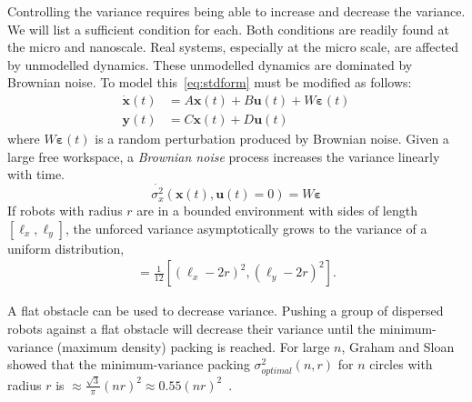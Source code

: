 Controlling the variance requires being able to increase and decrease the variance.  We will list a sufficient condition for each. Both conditions are readily found at the micro and nanoscale. 
Real systems, especially at the micro scale, are affected by unmodelled dynamics. These unmodelled dynamics are dominated by Brownian noise. To model this~\eqref{eq:stdform} must be modified as follows:
\begin{align}
\dot{\mathbf{x}}(t)  &=  A \mathbf{x}(t) + B \mathbf{u}(t) + W \bm{\varepsilon}(t)\\
 \mathbf{y}(t) &= C  \mathbf{x}(t) + D  \mathbf{u}(t)\nonumber
\end{align}
where $W\bm{\varepsilon}(t)$ is a random perturbation produced by Brownian noise. Given a large free workspace, a \emph{Brownian noise} process increases the variance linearly with time.
\begin{equation}\dot{\sigma_x^2}(\mathbf{x}(t), \mathbf{u}(t) = 0)  = W \bm{\varepsilon} \end{equation}
If robots with radius $r$ are in a bounded environment with sides of length $[\ell_x, \ell_y]$, the unforced variance asymptotically grows to the variance of a uniform distribution,
\begin{align}
[\sigma_x^2,\sigma_y^2] = \frac{1}{12}[ (\ell_x - 2 r)^2,(\ell_y - 2 r)^2].\label{eq:VarianceUniformDistribution}
\end{align}

 A flat obstacle can be used to decrease variance. Pushing a group of dispersed robots against a flat obstacle will decrease their variance until the minimum-variance (maximum density) packing  is reached. For large $n$, Graham and Sloan showed that the minimum-variance packing  $\sigma^2_{optimal}(n,r)$ for $n$ circles with radius $r$ is $\approx 
   \frac{\sqrt{3}}{\pi} (n r)^2\approx 0.55(n r)^2 $~\cite{graham1990penny}. 

